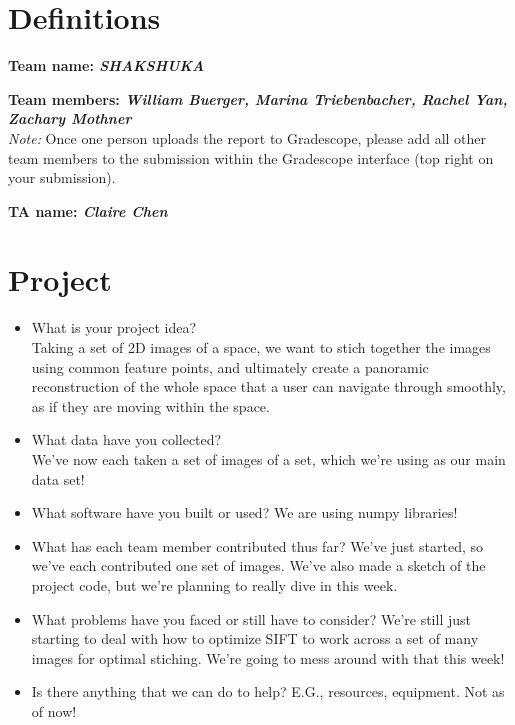 \section*{Definitions}

\textbf{Team name: \emph{SHAKSHUKA}}

\textbf{Team members: \emph{William Buerger, Marina Triebenbacher, Rachel Yan, Zachary Mothner}}\\
\emph{Note:} Once one person uploads the report to Gradescope, please add all other team members to the submission within the Gradescope interface (top right on your submission).

\textbf{TA name: \emph{Claire Chen}}

\section*{Project}
\begin{itemize}
  \item What is your project idea? \\
  Taking a set of 2D images of a space, we want to stich together the images using common feature points, and ultimately create a panoramic reconstruction of the whole space that a user can navigate through smoothly, as if they are moving within the space.

  \item What data have you collected? \\
  We've now each taken a set of images of a set, which we're using as our main data set!

  \item What software have you built or used?
  We are using numpy libraries!

  \item What has each team member contributed thus far?
  We've just started, so we've each contributed one set of images. We've also made a sketch of the project code, but we're planning to really dive in this week.

  \item What problems have you faced or still have to consider?
  We're still just starting to deal with how to optimize SIFT to work across a set of many images for optimal stiching. We're going to mess around with that this week!

  \item Is there anything that we can do to help? E.G., resources, equipment.
  Not as of now!
\end{itemize}


